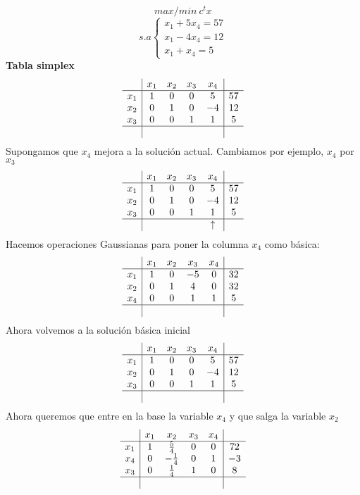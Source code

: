\begin{ejemplo}
  $$ max/min ~c^t x$$
  $$s.a \left\{
    \begin{array}{c}
      x_1+5x_4=57 \\
      x_1-4 x_4=12 \\
      x_1+x_4 = 5
    \end{array}
  \right.$$
  \textbf{Tabla simplex}
  $$
  \begin{array}{c|cccc|c}
    & x_1 & x_2 & x_3 & x_4 &  \\ \hline
    x_1 & 1 & 0 & 0 & 5 & 57 \\
    x_2 & 0 & 1 & 0 & -4 & 12 \\
    x_3 & 0 & 0 & 1 & 1 & 5 \\ \hline
    & & & & &
  \end{array}
  $$
  Supongamos que $x_4$ mejora a la solución actual. Cambiamos por ejemplo, $x_4$ por $x_3$
  $$
  \begin{array}{c|cccc|c}
    & x_1 & x_2 & x_3 & x_4 &  \\ \hline
    x_1 & 1 & 0 & 0 & 5 & 57 \\
    x_2 & 0 & 1 & 0 & -4 & 12 \\
    x_3 & 0 & 0 & 1 & 1 & 5 \\ \hline
    & & & & \uparrow &
  \end{array}
  $$
  Hacemos operaciones Gaussianas para poner la columna $x_4$ como básica:
  $$
  \begin{array}{c|cccc|c}
    & x_1 & x_2 & x_3 & x_4 &  \\ \hline
    x_1 & 1 & 0 & -5 & 0 & 32 \\
    x_2 & 0 & 1 & 4 & 0 & 32 \\
    x_4 & 0 & 0 & 1 & 1 & 5 \\ \hline
    & & & &  &
  \end{array}
  $$
  Ahora volvemos a la solución básica inicial
  $$
  \begin{array}{c|cccc|c}
    & x_1 & x_2 & x_3 & x_4 &  \\ \hline
    x_1 & 1 & 0 & 0 & 5 & 57 \\
    x_2 & 0 & 1 & 0 & -4 & 12 \\
    x_3 & 0 & 0 & 1 & 1 & 5 \\ \hline
    & & & & &
  \end{array}
  $$
  Ahora queremos que entre en la base la variable $x_4$ y que salga la variable $x_2$
  $$
  \begin{array}{c|cccc|c}
    & x_1 & x_2 & x_3 & x_4 &  \\ \hline
    x_1 & 1 & \frac{5}{4} & 0 & 0 & 72 \\
    x_4 & 0 & -\frac{1}{4} & 0 & 1 & -3 \\
    x_3 & 0 & \frac{1}{4} & 1 & 0 & 8 \\ \hline
    & & & & &
  \end{array}
  $$
\end{ejemplo}
